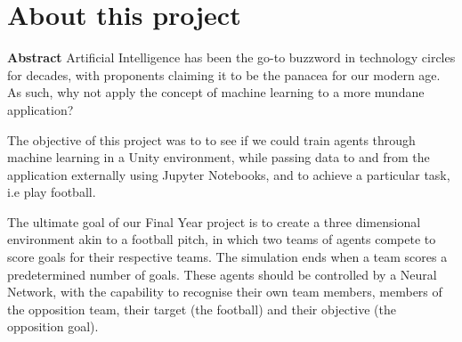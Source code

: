 
\chapter*{About this project}
\large\textbf{Abstract}
\newline
Artificial Intelligence has been the go-to buzzword in technology circles for decades, with proponents claiming it to be the panacea for our modern age. As such, why not apply the concept of machine learning to a more mundane application?

The objective of this project was to to see if we could train agents through machine learning in a Unity environment, while passing data to and from the application externally using Jupyter Notebooks, and to achieve a particular task, i.e play football.

The ultimate goal of our Final Year project is to create a three dimensional environment akin to a football pitch, in which two teams of agents compete to score goals for their respective teams. The simulation ends when a team scores a predetermined number of goals. These agents should be controlled by a Neural Network, with the capability to recognise their own team members, members of the opposition team, their target (the football) and their objective (the opposition goal).
